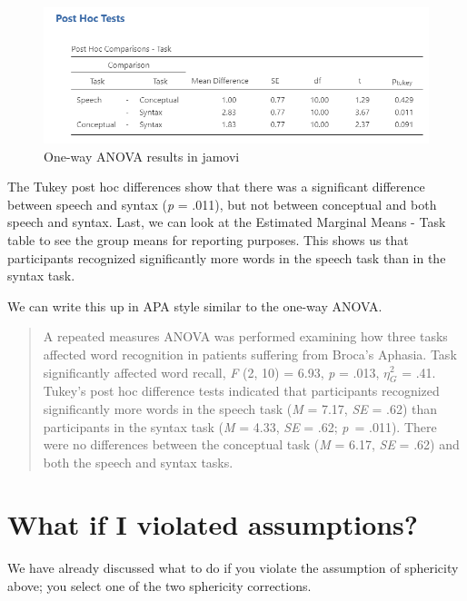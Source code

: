 \documentclass[
]{book}
\begin{document}
\begin{figure}

{\centering \includegraphics[width=1\linewidth]{images/05-repeated-measures-anova/rm-anova_tukey} 

}

\caption{One-way ANOVA results in jamovi}\label{fig:unnamed-chunk-8}
\end{figure}

The Tukey post hoc differences show that there was a significant difference between speech and syntax (\emph{p} = .011), but not between conceptual and both speech and syntax. Last, we can look at the Estimated Marginal Means - Task table to see the group means for reporting purposes. This shows us that participants recognized significantly more words in the speech task than in the syntax task.

We can write this up in APA style similar to the one-way ANOVA.

\begin{quote}
A repeated measures ANOVA was performed examining how three tasks affected word recognition in patients suffering from Broca's Aphasia. Task significantly affected word recall, \emph{F} (2, 10) = 6.93, \emph{p} = .013, \(\eta^2_G\) = .41. Tukey's post hoc difference tests indicated that participants recognized significantly more words in the speech task (\emph{M} = 7.17, \emph{SE} = .62) than participants in the syntax task (\emph{M} = 4.33, \emph{SE} = .62; \emph{p}~= .011). There were no differences between the conceptual task (\emph{M} = 6.17, \emph{SE} = .62) and both the speech and syntax tasks.
\end{quote}

\hypertarget{what-if-i-violated-assumptions-1}{%
\section{What if I violated assumptions?}\label{what-if-i-violated-assumptions-1}}

We have already discussed what to do if you violate the assumption of sphericity above; you select one of the two sphericity corrections.
\end{document}
